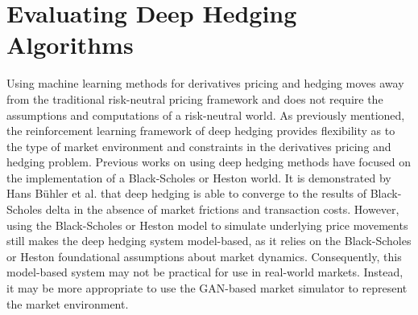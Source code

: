 \section{Evaluating Deep Hedging Algorithms}
Using machine learning methods for derivatives pricing and hedging moves away from the traditional risk-neutral pricing framework and does not require the assumptions and computations of a risk-neutral world. As previously mentioned, the reinforcement learning framework of deep hedging provides flexibility as to the type of market environment and constraints in the derivatives pricing and hedging problem. Previous works on using deep hedging methods have focused on the implementation of a Black-Scholes or Heston world. It is demonstrated by Hans Bühler et al. \cite{deep-hedging} that deep hedging is able to converge to the results of Black-Scholes delta in the absence of market frictions and transaction costs. However, using the Black-Scholes or Heston model to simulate underlying price movements still makes the deep hedging system model-based, as it relies on the Black-Scholes or Heston foundational assumptions about market dynamics. Consequently, this model-based system may not be practical for use in real-world markets. Instead, it may be more appropriate to use the GAN-based market simulator to represent the market environment.

